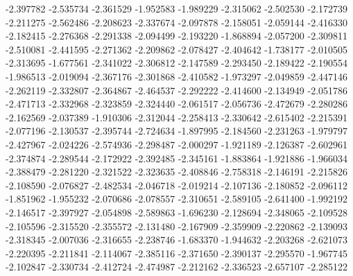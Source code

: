 -2.397782
-2.535734
-2.361529
-1.952583
-1.989229
-2.315062
-2.502530
-2.172739
-2.211275
-2.562486
-2.208623
-2.337674
-2.097878
-2.158051
-2.059144
-2.416330
-2.182415
-2.276368
-2.291338
-2.094499
-2.193220
-1.868894
-2.057200
-2.309811
-2.510081
-2.441595
-2.271362
-2.209862
-2.078427
-2.404642
-1.738177
-2.010505
-2.313695
-1.677561
-2.341022
-2.306812
-2.147589
-2.293450
-2.189422
-2.190554
-1.986513
-2.019094
-2.367176
-2.301868
-2.410582
-1.973297
-2.049859
-2.447146
-2.262119
-2.332807
-2.364867
-2.464537
-2.292222
-2.414600
-2.134949
-2.051786
-2.471713
-2.332968
-2.323859
-2.324440
-2.061517
-2.056736
-2.472679
-2.280286
-2.162569
-2.037389
-1.910306
-2.312044
-2.258413
-2.330642
-2.615402
-2.215391
-2.077196
-2.130537
-2.395744
-2.724634
-1.897995
-2.184560
-2.231263
-1.979797
-2.427967
-2.024226
-2.574936
-2.298487
-2.000297
-1.921189
-2.126387
-2.602961
-2.374874
-2.289544
-2.172922
-2.392485
-2.345161
-1.883864
-1.921886
-1.966034
-2.388479
-2.281220
-2.321522
-2.323635
-2.408846
-2.758318
-2.146191
-2.215826
-2.108590
-2.076827
-2.482534
-2.046718
-2.019214
-2.107136
-2.180852
-2.096112
-1.851962
-1.955232
-2.070686
-2.078557
-2.310651
-2.589105
-2.641400
-1.992192
-2.146517
-2.397927
-2.054898
-2.589863
-1.696230
-2.128694
-2.348065
-2.109528
-2.105596
-2.315520
-2.355572
-2.131480
-2.167909
-2.359909
-2.220862
-2.139093
-2.318345
-2.007036
-2.316655
-2.238746
-1.683370
-1.944632
-2.203268
-2.621073
-2.220395
-2.211841
-2.114067
-2.385116
-2.371650
-2.390137
-2.295570
-1.967745
-2.102847
-2.330734
-2.412724
-2.474987
-2.212162
-2.336523
-2.657107
-2.285122

